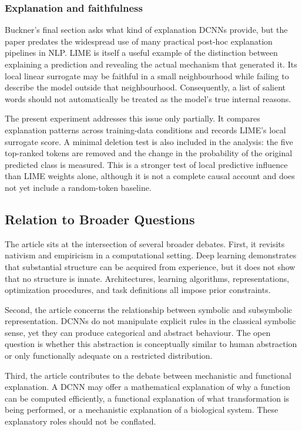 \documentclass[11pt]{article}
\begin{document}
\subsubsection*{Explanation and faithfulness}

Buckner's final section asks what kind of explanation DCNNs provide, but the paper predates the widespread use of many practical post-hoc explanation pipelines in NLP. LIME is itself a useful example of the distinction between explaining a prediction and revealing the actual mechanism that generated it. Its local linear surrogate may be faithful in a small neighbourhood while failing to describe the model outside that neighbourhood. Consequently, a list of salient words should not automatically be treated as the model's true internal reasons.

The present experiment addresses this issue only partially. It compares explanation patterns across training-data conditions and records LIME's local surrogate score. A minimal deletion test is also included in the analysis: the five top-ranked tokens are removed and the change in the probability of the original predicted class is measured. This is a stronger test of local predictive influence than LIME weights alone, although it is not a complete causal account and does not yet include a random-token baseline.

\subsection{Relation to Broader Questions}

The article sits at the intersection of several broader debates. First, it revisits nativism and empiricism in a computational setting. Deep learning demonstrates that substantial structure can be acquired from experience, but it does not show that no structure is innate. Architectures, learning algorithms, representations, optimization procedures, and task definitions all impose prior constraints.

Second, the article concerns the relationship between symbolic and subsymbolic representation. DCNNs do not manipulate explicit rules in the classical symbolic sense, yet they can produce categorical and abstract behaviour. The open question is whether this abstraction is conceptually similar to human abstraction or only functionally adequate on a restricted distribution.

Third, the article contributes to the debate between mechanistic and functional explanation. A DCNN may offer a mathematical explanation of why a function can be computed efficiently, a functional explanation of what transformation is being performed, or a mechanistic explanation of a biological system. These explanatory roles should not be conflated.
\end{document}
